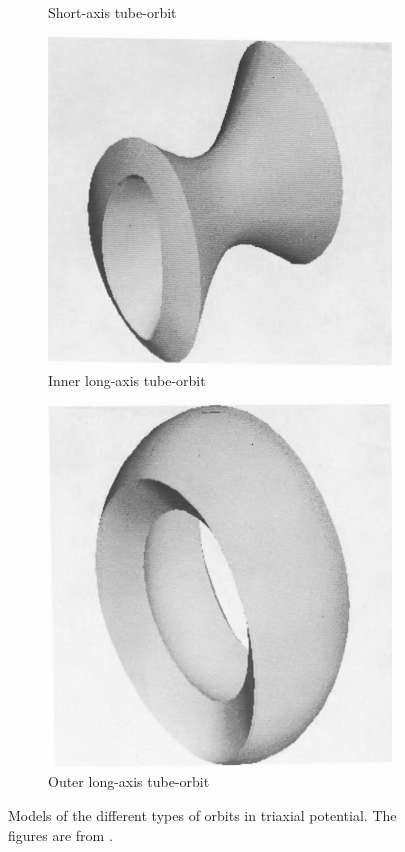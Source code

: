 \documentclass[english, oneside]{HYgradu}
\begin{document}
\begin{figure}
\begin{subfigure}[b]{0.49\textwidth}
		\caption{Short-axis tube-orbit}
	\end{subfigure}
	\begin{subfigure}[b]{0.49\textwidth}
		\includegraphics[width=\textwidth]{statler_long_inner.png}
		\caption{Inner long-axis tube-orbit}
	\end{subfigure}
	\begin{subfigure}[b]{0.49\textwidth}
		\includegraphics[width=\textwidth]{statler_long_outer.png}
		\caption{Outer long-axis tube-orbit}
	\end{subfigure}
	\caption{Models of the different types of orbits in triaxial potential. The figures are from \cite{Statler1987}.}
	\label{figure:triaxial_orbits}
\end{figure}
\end{document}
